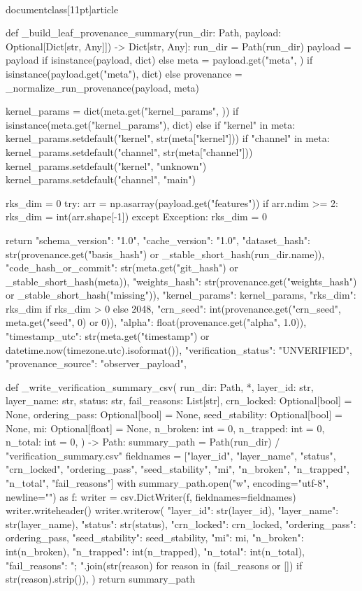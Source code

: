 \\documentclass[11pt]{article}
\begin{document}
\begin{CodeBlock}
def _build_leaf_provenance_summary(run_dir: Path, payload: Optional[Dict[str, Any]]) -> Dict[str, Any]:
    run_dir = Path(run_dir)
    payload = payload if isinstance(payload, dict) else {}
    meta = payload.get("meta", {}) if isinstance(payload.get("meta"), dict) else {}
    provenance = _normalize_run_provenance(payload, meta)

    kernel_params = dict(meta.get("kernel_params", {})) if isinstance(meta.get("kernel_params"), dict) else {}
    if "kernel" in meta:
        kernel_params.setdefault("kernel", str(meta["kernel"]))
    if "channel" in meta:
        kernel_params.setdefault("channel", str(meta["channel"]))
    kernel_params.setdefault("kernel", "unknown")
    kernel_params.setdefault("channel", "main")

    rks_dim = 0
    try:
        arr = np.asarray(payload.get("features"))
        if arr.ndim >= 2:
            rks_dim = int(arr.shape[-1])
    except Exception:
        rks_dim = 0

    return {
        "schema_version": "1.0",
        "cache_version": "1.0",
        "dataset_hash": str(provenance.get("basis_hash") or _stable_short_hash(run_dir.name)),
        "code_hash_or_commit": str(meta.get("git_hash") or _stable_short_hash(meta)),
        "weights_hash": str(provenance.get("weights_hash") or _stable_short_hash("missing")),
        "kernel_params": kernel_params,
        "rks_dim": rks_dim if rks_dim > 0 else 2048,
        "crn_seed": int(provenance.get("crn_seed", meta.get("seed", 0) or 0)),
        "alpha": float(provenance.get("alpha", 1.0)),
        "timestamp_utc": str(meta.get("timestamp") or datetime.now(timezone.utc).isoformat()),
        "verification_status": "UNVERIFIED",
        "provenance_source": "observer_payload",
    }


def _write_verification_summary_csv(
    run_dir: Path,
    *,
    layer_id: str,
    layer_name: str,
    status: str,
    fail_reasons: List[str],
    crn_locked: Optional[bool] = None,
    ordering_pass: Optional[bool] = None,
    seed_stability: Optional[bool] = None,
    mi: Optional[float] = None,
    n_broken: int = 0,
    n_trapped: int = 0,
    n_total: int = 0,
) -> Path:
    summary_path = Path(run_dir) / "verification_summary.csv"
    fieldnames = ["layer_id", "layer_name", "status", "crn_locked", "ordering_pass", "seed_stability", "mi", "n_broken", "n_trapped", "n_total", "fail_reasons"]
    with summary_path.open("w", encoding="utf-8", newline="") as f:
        writer = csv.DictWriter(f, fieldnames=fieldnames)
        writer.writeheader()
        writer.writerow(
            {
                "layer_id": str(layer_id),
                "layer_name": str(layer_name),
                "status": str(status),
                "crn_locked": crn_locked,
                "ordering_pass": ordering_pass,
                "seed_stability": seed_stability,
                "mi": mi,
                "n_broken": int(n_broken),
                "n_trapped": int(n_trapped),
                "n_total": int(n_total),
                "fail_reasons": "; ".join(str(reason) for reason in (fail_reasons or []) if str(reason).strip()),
            }
        )
    return summary_path



\end{CodeBlock}
\end{document}
